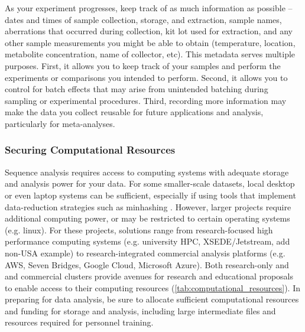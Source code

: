 \documentclass[10pt,letterpaper]{article}
\begin{document}
As your experiment progresses, keep track of as much information as possible -- dates and times of sample collection, storage, and extraction, sample names, aberrations that occurred during collection, kit lot used for extraction, and any other sample measurements you might be able to obtain (temperature, location, metabolite concentration, name of collector, etc). 
This metadata serves multiple purposes. 
First, it allows you to keep track of your samples and perform the experiments or comparisons you intended to perform. 
Second, it allows you to control for batch effects that may arise from unintended batching during sampling or experimental procedures. 
Third, recording more information may make the data you collect reusable for future applications and analysis, particularly for meta-analyses. 

\subsubsection*{Securing Computational Resources}

Sequence analysis requires access to computing systems with adequate storage and analysis power for your data. 
For some smaller-scale datasets, local desktop or even laptop systems can be sufficient, especially if using tools that implement data-reduction strategies such as minhashing \cite{rowe2019streaming}. 
However, larger projects require additional computing power, or may be restricted to certain operating systems (e.g. linux). 
For these projects, solutions range from research-focused high performance computing systems (e.g. university HPC, XSEDE/Jetstream, add non-USA example) to research-integrated commercial analysis platforms (e.g. AWS, Seven Bridges, Google Cloud, Microsoft Azure). 
Both research-only and  and commercial clusters provide avenues for research and educational proposals to enable access to their computing resources (\ref{tab:computational_resources}). 
In preparing for data analysis, be sure to allocate sufficient computational resources and funding for storage and analysis, including large intermediate files and resources required for personnel training. 
\end{document}
